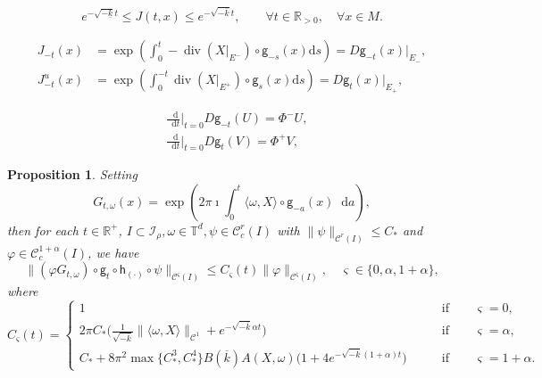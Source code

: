\documentclass[10pt,a4paper]{amsart}
\newtheorem{proposition}{Proposition}
\newcommand \R {{ \mathbb R}}
\newcommand \T {{ \mathbb T}}
\newcommand \cC {{\mathscr{C}}}
\newcommand \cI {{\mathcal I}}
\newcommand*{\diff}{\mathop{}\!\mathrm{d}}
\newcommand{\geo}{\mathsf{g}}
\newcommand{\horo}{\mathsf{h}}
\begin{document}
\begin{equation}
e^{-\sqrt{-\underline k}t} \le J(t,x) \le e^{-\sqrt{-\overline k}t}, \qquad \forall t\in \R_{>0}, \quad \forall x\in M.
\end{equation}

 \begin{equation}\label{eq:potential}
 \begin{split}
 J_{-t}(x)&=\exp\left({\int_0^t -\operatorname{div} (X|_{E^-})\circ \geo_{-s}(x)\mathrm d s}\right)=D\geo_{-t}(x)|_{E_-},\\
  J^u_{-t}(x)&=\exp\left({\int_0^{-t} \operatorname{div} (X|_{E^+})\circ \geo_s(x)\mathrm d s}\right)=D\geo_{t}(x)|_{E_+},
 \end{split}
 \end{equation}

\begin{equation}\label{eq:div}
\begin{split}
&\frac{\diff}{\diff t}\Big\vert_{t=0} D\geo_{-t}(U)=\Phi^- U,\\
&\frac{\diff}{\diff t}\Big\vert_{t=0} D\geo_{t}(V)=\Phi^+ V,
\end{split}
\end{equation}

\begin{proposition}\label{prop:G}
Setting 
\[
G_{t,\omega}(x)=\exp\left( 2\pi \imath \int_0^t \langle \omega, X\rangle\circ \geo_{-a}(x)\diff a  \right),
\]
then for each $t\in \R^+$, $ I\subset \cI_\rho, \omega \in \T^d, \psi\in \cC^r_c(I)$ with $\|\psi\|_{\cC^r(I)}\le C_*$ and $\varphi\in \cC^{1+\alpha}_c(I)$, we have
\[
 \|(\varphi G_{t,\omega})\circ \geo_t\circ \horo_{(\cdot)}\circ \psi \|_{\cC^{\varsigma}(I)}  \le C_\varsigma(t) \|\varphi\|_{\cC^\varsigma(I)}, \quad \varsigma \in \{0,\alpha, 1+\alpha\},
\]
where
\begin{equation}\label{eq:C(t)}
C_\varsigma(t)=\begin{cases}  1 \qquad &\text{if}\qquad  \varsigma=0,\\ 					   
					    2\pi C_*\big(\frac{1 }{\sqrt{-\overline k}}\|\langle \omega, X \rangle \|_{\cC^1} +e^{-\sqrt{-\overline k}\alpha t}\big) \qquad &\text{if} \qquad\varsigma=\alpha,\\
					   C_*+8\pi^2\max\{C_*^3,C_*^4\} B(\overline k)A(X,\omega)\big(1+4e^{-\sqrt{-\overline k}(1+\alpha)t}\big) \qquad &\text{if} \qquad\varsigma=1+\alpha.
		\end{cases}
\end{equation}

\end{proposition}
\end{document}
